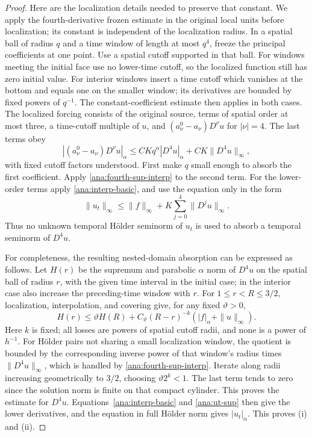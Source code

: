 \begin{proof}
Here are the localization details needed to preserve that constant.
We apply the fourth-derivative frozen estimate in the original local
units before localization; its constant is independent of the
localization radius.
In a spatial ball of radius $q$ and a time window of length at most
$q^4$, freeze the principal coefficients at one point.  Use a spatial
cutoff supported in that ball.  For windows meeting the initial
face use no lower-time cutoff, so the localized function still has
zero initial value.  For interior windows insert a time cutoff
which vanishes at the bottom and equals one on the smaller window;
its derivatives are bounded by fixed powers of $q^{-1}$.  The
constant-coefficient estimate then applies in both cases.  The
localized forcing consists of the original source, terms of spatial
order at most three, a time-cutoff multiple of $u$, and
$(a_\nu^0-a_\nu)D^\nu u$ for $|\nu|=4$.
The last terms obey
\begin{equation}\label{ana:freeze-bound}
 |(a_\nu^0-a_\nu)D^\nu u|_\alpha
 \le CKq^\alpha|D^4u|_\alpha
             +CK\|D^4u\|_\infty,
\end{equation}
with fixed cutoff factors understood.  First make $q$ small enough
to absorb the first coefficient.  Apply
\eqref{ana:fourth-sup-interp} to the second term.  For the lower-order
terms apply \eqref{ana:interp-basic}, and use the equation only in
the form
\begin{equation}\label{ana:ut-sup}
 \|u_t\|_\infty\le\|f\|_\infty
                   +K\sum_{j=0}^4\|D^ju\|_\infty.
\end{equation}
Thus no unknown temporal H\"older seminorm of $u_t$ is used to
absorb a temporal seminorm of $D^4u$.

For completeness, the resulting nested-domain absorption can be
expressed as follows.  Let $H(r)$ be the supremum and parabolic
$\alpha$ norm of $D^4u$ on the spatial ball of radius $r$, with the
given time interval in the initial case; in the interior case also
increase the preceding-time window with $r$.  For $1\le r<R\le3/2$,
localization, interpolation, and covering give, for any fixed
$\vartheta>0$,
\[
 H(r)\le\vartheta H(R)
       +C_\vartheta(R-r)^{-k}
                      (|f|_\alpha+\|u\|_\infty).
\]
Here $k$ is fixed; all losses are powers of spatial cutoff radii,
and none is a power of $h^{-1}$.  For H\"older pairs not sharing a
small localization window, the quotient is bounded by the
corresponding inverse power of that window's radius times
$\|D^4u\|_\infty$, which is handled by
\eqref{ana:fourth-sup-interp}.  Iterate along radii increasing
geometrically to $3/2$, choosing $\vartheta 2^k<1$.
The last term tends to zero since the solution norm is finite on
that compact cylinder.  This proves the estimate for $D^4u$.
Equations~\eqref{ana:interp-basic} and \eqref{ana:ut-sup} then give
the lower derivatives, and the equation in full H\"older norm gives
$|u_t|_\alpha$.  This proves \textup{(i)} and \textup{(ii)}.


\end{proof}
